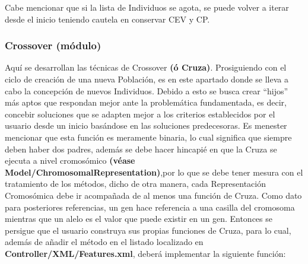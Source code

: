 \documentclass[class=report, crop=false]{standalone}
\begin{document}
\begin{fulllineitems}
\begin{DUlineblock}{0em}
Cabe mencionar que si la lista de Individuos se agota, 
se puede volver a iterar desde el inicio teniendo cautela en 
conservar CEV y CP.
\end{DUlineblock}

\end{fulllineitems}

\subsubsection{Crossover (módulo)}
\label{sec:a_2_4_2}
Aquí se desarrollan las técnicas de Crossover 
\textbf{(ó Cruza)}.\medskip\break
Prosiguiendo con el ciclo de creación de una nueva Población, 
es en este apartado donde se lleva a cabo la concepción de 
nuevos Individuos.\break
Debido a esto se busca crear ``hijos'' más aptos que respondan 
mejor ante la problemática fundamentada, es decir, concebir 
soluciones que se adapten mejor a los criterios establecidos
por el usuario desde un inicio basándose en las soluciones 
predecesoras.\medskip\break
Es menester mencionar que esta función es meramente binaria, 
lo cual significa que siempre deben haber dos padres, además 
se debe hacer hincapié en que la Cruza se ejecuta a nivel cromosómico 
\textbf{(véase Model/ChromosomalRepresentation)},por lo que se 
debe tener mesura con el tratamiento de los métodos, dicho de otra 
manera, cada Representación Cromosómica debe ir acompañada de al 
menos una función de Cruza.\medskip\break
Como dato para posteriores referencias, un gen hace referencia 
a una casilla del cromosoma mientras que un alelo es el valor 
que puede existir en un gen.\break
Entonces se persigue que el usuario construya sus propias funciones 
de Cruza, para lo cual, además de añadir el método en el listado 
localizado en \textbf{Controller/XML/Features.xml}, deberá implementar 
la siguiente función:
\end{document}
